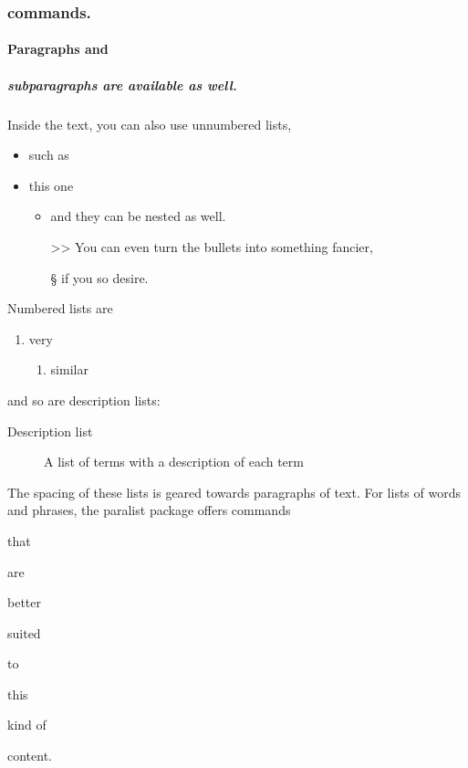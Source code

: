 \documentclass[
  digital, %
  table,   %
  nolof,     %
  nolot,     %
]{fithesis3}
\begin{document}
\subsubsection{commands.}
\paragraph{Paragraphs and}
\subparagraph{subparagraphs are available as well.}
Inside the text, you can also use unnumbered lists,
\begin{itemize}
  \item such as
  \item this one
  \begin{itemize}
    \item     and they can be nested as well.
    \item[>>] You can even turn the bullets into something fancier,
    \item[\S] if you so desire.
  \end{itemize}
\end{itemize}
Numbered lists are
\begin{enumerate}
  \item very
  \begin{enumerate}
    \item similar
  \end{enumerate}
\end{enumerate}
and so are description lists:
\begin{description}
  \item[Description list]
    A list of terms with a description of each term
\end{description}
The spacing of these lists is geared towards paragraphs of text.
For lists of words and phrases, the \textsf{paralist} package
offers commands
\begin{compactitem}
  \item that
  \begin{compactitem}
    \item are
    \begin{compactitem}
      \item better
      \begin{compactitem}
        \item suited
      \end{compactitem}
    \end{compactitem}
  \end{compactitem}
\end{compactitem}
\begin{compactenum}
  \item to
  \begin{compactenum}
    \item this
    \begin{compactenum}
      \item kind of
      \begin{compactenum}
        \item content.
      \end{compactenum}
    \end{compactenum}
  \end{compactenum}
\end{compactenum}
\end{document}
